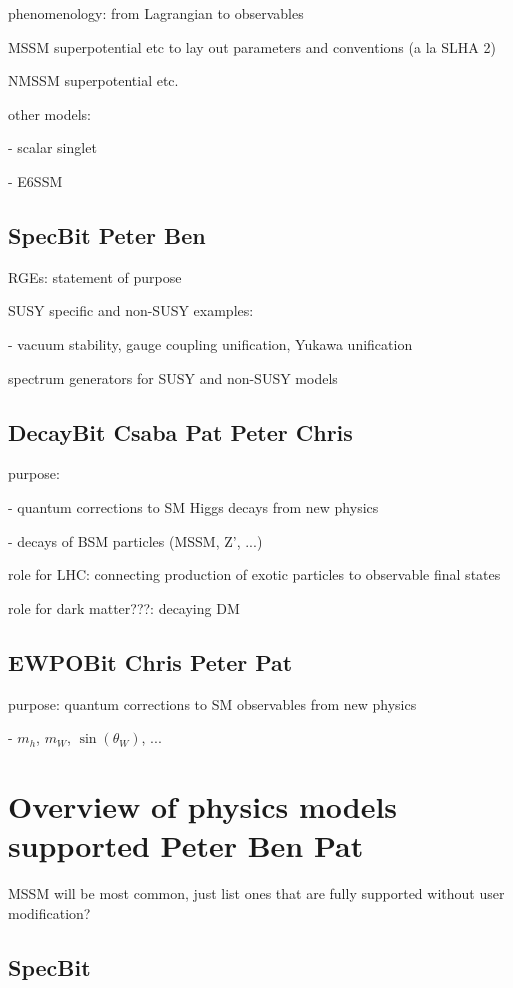 \documentclass[11pt,a4paper]{article}
\newcommand{\Ben}[1]{{\bf\color{magenta}Ben #1}}
\newcommand{\Csaba}[1]{{\bf\color{orange}Csaba #1}}
\newcommand{\Chris}[1]{{\bf\color{yellow}Chris #1}}
\newcommand{\Pat}[1]{{\bf\color{cyan}Pat #1}}
\newcommand{\Peter}[1]{{\bf\color{green}Peter #1}}
\begin{document}
phenomenology: from Lagrangian to observables 

MSSM superpotential etc to lay out parameters and conventions (a la SLHA 2)

NMSSM superpotential etc.

other models:

- scalar singlet

- E6SSM


\subsection{SpecBit \Peter{} \Ben{}}

RGEs: statement of purpose

SUSY specific and non-SUSY examples:

- vacuum stability, gauge coupling unification, Yukawa unification

spectrum generators for SUSY and non-SUSY models
 
 
\subsection{DecayBit \Csaba{} \Pat{} \Peter{} \Chris{}}

purpose: 

- quantum corrections to SM Higgs decays from new physics

- decays of BSM particles (MSSM, Z', ...)

role for LHC: connecting production of exotic particles to observable final states

role for dark matter???: decaying DM


\subsection{EWPOBit \Chris{} \Peter{} \Pat{}}

purpose: quantum corrections to SM observables from new physics

- $m_h$, $m_W$, $\sin(\theta_W)$, ...


\section{Overview of physics models supported \Peter{} \Ben{} \Pat{}}

MSSM will be most common, just list ones that are fully supported without user modification?

\subsection{SpecBit}
\end{document}
